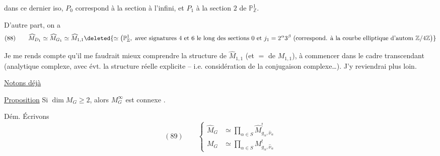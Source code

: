 dans ce dernier iso, $P_0$ correspond à la section à l'infini, et $P_1$ à la section $2$ de $\mathbb P^1_{\mathbb Z}$.

D'autre part, on a
\[
(88)\qquad \widehat M_{D_1}\simeq\widehat M_{G_1}\simeq\widehat M_{1,1}
\deleted{\simeq\bigl(\mathbb P^1_{\mathbb Z},\text{ avec signatures }4\text{ et }6\text{ le long des sections }0\text{ et }j_1=2^{\alpha}3^{\beta}\text{ (correspond. à la courbe elliptique d'autom }\mathbb Z/4\mathbb Z\bigr)}
\]

Je me rends compte qu'il me faudrait mieux comprendre la structure de $\widehat M_{1,1}$ (et $=$ de $M_{1,1}$), à commencer dans le cadre transcendant (analytique complexe, avec évt. la structure réelle explicite -- i.e. considération de la conjugaison complexe\ldots). J'y reviendrai plus loin.

\uline{Notons déjà}

\uline{Proposition} Si $\dim M_G\geq2$, alors $M_G^\infty$ est  connexe .

Dém. Écrivons
\[
(89)\qquad\left\{\begin{aligned}
\widehat M_G&\simeq\prod_{\alpha\in S}\widehat M^{!}_{g_\alpha,\widehat\nu_\alpha}\\
M_G&\simeq\prod_{\alpha\in S}M^{!}_{g_\alpha,\widehat\nu_\alpha}
\end{aligned}\right.
\]
